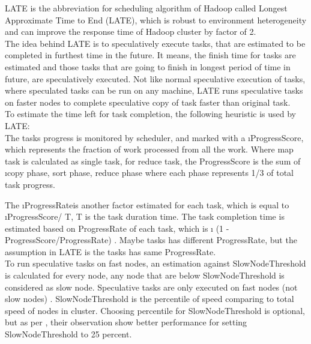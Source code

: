 LATE‌ is the abbreviation for scheduling algorithm of Hadoop called Longest Approximate Time to End (LATE), which is robust to environment heterogeneity and can improve the response time of Hadoop cluster by factor of 2\cite{mat1}. \\

The idea behind LATE‌ is to speculatively execute tasks, that are estimated to be completed in furthest  time in the future. It means, the finish time for tasks are estimated and those tasks that are going to finish in longest period of time in future, are speculatively executed. Not like normal speculative execution of tasks, where speculated tasks can be run on any machine, LATE‌ runs speculative tasks on faster nodes to complete speculative copy of task faster than original task. \\

To estimate the time left for task completion, the following heuristic is used by LATE:\\
 The tasks progress is monitored by scheduler, and marked with a \i{ProgressScore}, which represents the fraction of work processed from all the work. Where map task is calculated as single task, for reduce task,  the ProgressScore is the sum of \i{copy phase, sort phase, reduce phase}‌ where each phase represents 1/3 of total task progress.
  
 The \i{ProgressRate}‌is another factor estimated for each task, which is equal to \i{ProgressScore/ T}, T is the task duration time. The task completion time is estimated based on ProgressRate of each task, which is \i{ (1 - ProgressScore/ProgressRate) }. Maybe tasks has different ProgressRate, but the assumption in LATE‌ is the tasks has same ProgressRate.\\  
  
To run speculative tasks on fast nodes, an estimation against SlowNodeThreshold is calculated for every node, any node that are below SlowNodeThreshold is considered as slow node. Speculative tasks are only executed on fast nodes (not slow nodes) . SlowNodeThreshold is the percentile of speed comparing to total speed of nodes in cluster. Choosing percentile for SlowNodeThreshold is optional, but as per \cite{mat1}, their observation show better performance for setting SlowNodeThreshold to 25 percent.\\   

